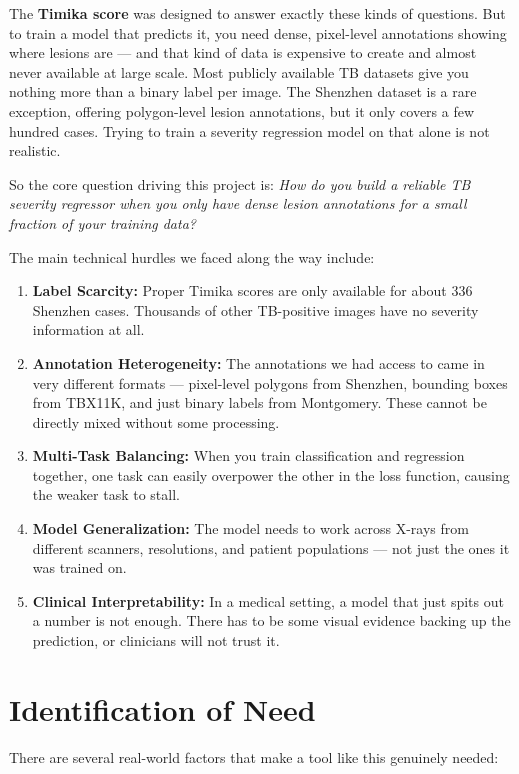 \documentclass[12pt]{report}
\begin{document}
The \textbf{Timika score} was designed to answer exactly these kinds of questions. But to train a model that predicts it, you need dense, pixel-level annotations showing where lesions are --- and that kind of data is expensive to create and almost never available at large scale. Most publicly available TB datasets give you nothing more than a binary label per image. The Shenzhen dataset is a rare exception, offering polygon-level lesion annotations, but it only covers a few hundred cases. Trying to train a severity regression model on that alone is not realistic.

So the core question driving this project is: \textit{How do you build a reliable TB severity regressor when you only have dense lesion annotations for a small fraction of your training data?}

The main technical hurdles we faced along the way include:
\begin{enumerate}
    \item \textbf{Label Scarcity:} Proper Timika scores are only available for about 336 Shenzhen cases. Thousands of other TB-positive images have no severity information at all.
    \item \textbf{Annotation Heterogeneity:} The annotations we had access to came in very different formats --- pixel-level polygons from Shenzhen, bounding boxes from TBX11K, and just binary labels from Montgomery. These cannot be directly mixed without some processing.
    \item \textbf{Multi-Task Balancing:} When you train classification and regression together, one task can easily overpower the other in the loss function, causing the weaker task to stall.
    \item \textbf{Model Generalization:} The model needs to work across X-rays from different scanners, resolutions, and patient populations --- not just the ones it was trained on.
    \item \textbf{Clinical Interpretability:} In a medical setting, a model that just spits out a number is not enough. There has to be some visual evidence backing up the prediction, or clinicians will not trust it.
\end{enumerate}

\section{Identification of Need}

There are several real-world factors that make a tool like this genuinely needed:
\end{document}

